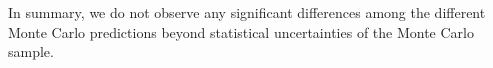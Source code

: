 \begin{figure}[!htbp]
\begin{center}
\caption{
}
\label{fig:wwshape_scalevariation_MVA300_MadgrahVsMCAtNLO}
\end{center}
\end{figure}

In summary, we do not observe any significant differences among the different 
Monte Carlo predictions beyond statistical uncertainties of the Monte Carlo
sample.
